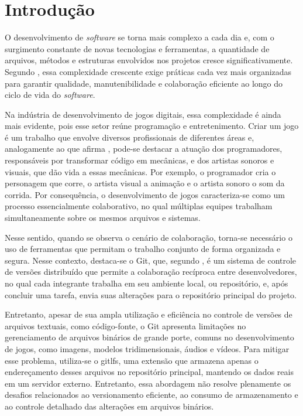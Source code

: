 
\chapter{Introdução}\label{cap:introducao}


O desenvolvimento de \textit{software} se torna mais complexo a cada dia e, com o surgimento constante de novas tecnologias e ferramentas, a quantidade de arquivos, métodos e estruturas envolvidos nos projetos cresce significativamente. Segundo , essa complexidade crescente exige práticas cada vez mais organizadas para garantir qualidade, manutenibilidade e colaboração eficiente ao longo do ciclo de vida do \textit{software}.

Na indústria de desenvolvimento de jogos digitais, essa complexidade é ainda mais evidente, pois esse setor reúne programação e entretenimento. Criar um jogo é um trabalho que envolve diversos profissionais de diferentes áreas e, analogamente ao que afirma , pode-se destacar a atuação dos programadores, responsáveis por transformar código em mecânicas, e dos artistas sonoros e visuais, que dão vida a essas mecânicas. Por exemplo, o programador cria o personagem que corre, o artista visual a animação e o artista sonoro o som da corrida. Por consequência, o desenvolvimento de jogos caracteriza-se como um processo essencialmente colaborativo, no qual múltiplas equipes trabalham simultaneamente sobre os mesmos arquivos e sistemas.

Nesse sentido, quando se observa o cenário de colaboração, torna-se necessário o uso de ferramentas que permitam o trabalho conjunto de forma organizada e segura. Nesse contexto, destaca-se o Git, que, segundo , é um sistema de controle de versões distribuído que permite a colaboração recíproca entre desenvolvedores, no qual cada integrante trabalha em seu ambiente local, ou repositório, e, após concluir uma tarefa, envia suas alterações para o repositório principal do projeto. 

Entretanto, apesar de sua ampla utilização e eficiência no controle de versões de arquivos textuais, como código-fonte, o Git apresenta limitações no gerenciamento de arquivos binários de grande porte, comuns no desenvolvimento de jogos, como imagens, modelos tridimensionais, áudios e vídeos. Para mitigar esse problema, utiliza-se o \gls{gitlfs}, uma extensão que armazena apenas o endereçamento desses arquivos no repositório principal, mantendo os dados reais em um servidor externo. Entretanto, essa abordagem não resolve plenamente os desafios relacionados ao versionamento eficiente, ao consumo de armazenamento e ao controle detalhado das alterações em arquivos binários.

